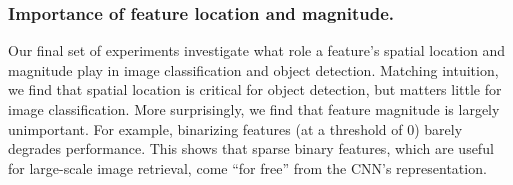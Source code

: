 \subsubsection{Importance of feature location and magnitude.}
Our final set of experiments investigate what role a feature's spatial location and magnitude play in image classification and object detection.
Matching intuition, we find that spatial location is critical for object detection, but matters little for image classification.
More surprisingly, we find that feature magnitude is largely unimportant.
For example, binarizing features (at a threshold of 0) barely degrades performance.
This shows that sparse binary features, which are useful for large-scale image retrieval, come ``for free'' from the CNN's representation.


